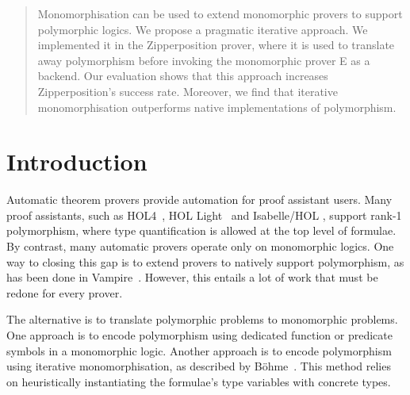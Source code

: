 \documentclass[runningheads]{llncs}
\begin{document}
\author{Tanguy Bozec \and
Jasmin Blanchette}




\maketitle

\begin{sloppy}
\begin{abstract}
Monomorphisation can be used to extend monomorphic provers to support polymorphic logics. We propose a pragmatic iterative approach. We implemented it in the Zipperposition prover, where it is used to translate away polymorphism before invoking the monomorphic prover E as a backend. Our evaluation shows that this approach increases Zipperposition's success rate. Moreover, we find that iterative monomorphisation outperforms native implementations of polymorphism.

\end{abstract}
\end{sloppy}

\section{Introduction}

Automatic theorem provers provide automation for proof assistant users. Many proof assistants, such as HOL4~\cite{slind-norrish-2008}, HOL Light~\cite{harrison-2009} and Isabelle\slash HOL \cite{nipkow-et-al-2002}, support rank-1 polymorphism, where type quantification is allowed at the top level of formulae. By contrast, many automatic provers operate only on monomorphic logics. One way to closing this gap is to extend provers to natively support polymorphism, as has been done in Vampire~\cite{bhayat-reger-2020}. However, this entails a lot of work that must be redone for every prover.

The alternative is to translate polymorphic problems to monomorphic problems.
One approach \cite[Section~9]{mono-trans} is to encode polymorphism using dedicated function or predicate symbols in a monomorphic logic. Another approach is to encode polymorphism using {iterative monomorphisation}, as described by B\"ohme~\cite[Section 2.2.1]{sb-phd}. This method relies on heuristically instantiating the formulae's type variables with concrete types.
\end{document}
